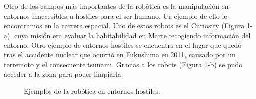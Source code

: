 Otro de los campos más importantes de la robótica es la manipulación en entornos inaccesibles u hostiles para el ser humano. Un ejemplo de ello lo encontramos en la carrera espacial. Uno de estos robots es el Curiosity (Figura \ref{fig:robots}-a), cuya misión era evaluar la habitabilidad en Marte recogiendo información del entorno. Otro ejemplo de entornos hostiles se encuentra en el lugar que quedó tras el accidente nuclear que ocurrió en Fukushima en 2011, causado por un terremoto y el consecuente tsunami. Gracias a los robots (Figura \ref{fig:robots}-b) se pudo acceder a la zona para poder limpiarla.\\
\begin{figure}[h!]
  \begin{center}
    \hspace{2mm}
  \end{center}
\caption{Ejemplos de la robótica en entornos hostiles.} \label{fig:robots}
\end{figure}

